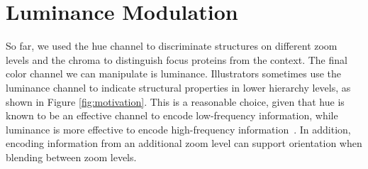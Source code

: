 \documentclass{egpubl}
\begin{document}
	
	
	
	
		
	
	
	\section{Luminance Modulation}
	\label{sec:luminance}
	
	So far, we used the hue channel to discriminate structures on different zoom levels and the chroma to distinguish focus proteins from the context. 
	The final color channel we can manipulate is luminance. 
	Illustrators sometimes use the luminance channel to indicate structural properties in lower hierarchy levels, as shown in Figure \ref{fig:motivation}. 
	This is a reasonable choice, given that hue is known to be an effective channel to encode low-frequency information, while luminance is more effective to encode high-frequency information~\cite{bergman1995rule}. 
	In addition, encoding information from an additional zoom level can support orientation when blending between zoom levels. 
	
\end{document}
